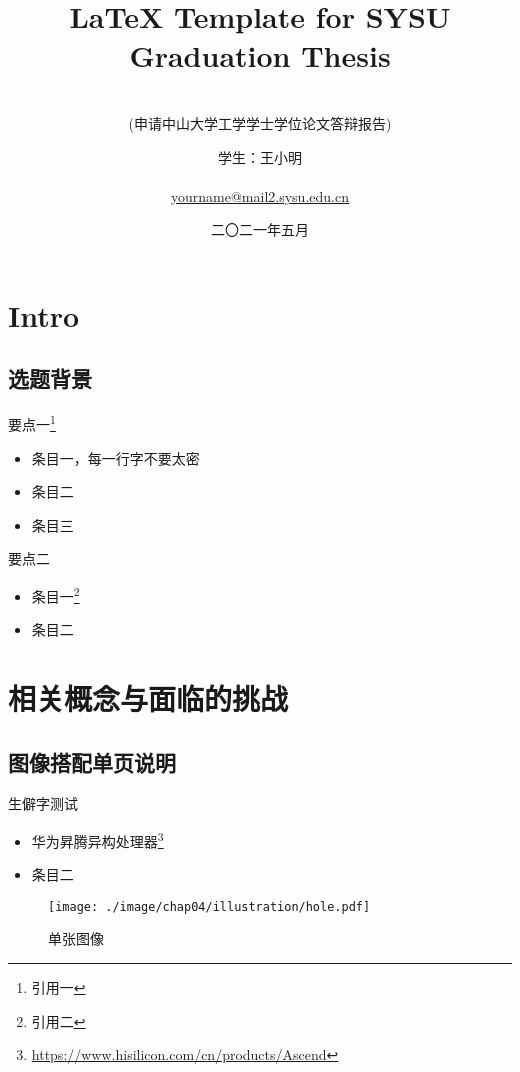 \documentclass[
    fontset=fandol,
    xcolor=x11names %
]{ctexbeamer}
\title{{\LaTeX} Template for SYSU Graduation Thesis}
\subtitle[申请中山大学工学学士学位论文答辩报告]{
    ~\\
    (申请中山大学工学学士学位论文答辩报告)
}
\author[王小明]{
    \texorpdfstring{
        学生：王小明\\
        ~\\
        \href{mailto:yourname@mail2.sysu.edu.cn}{yourname@mail2.sysu.edu.cn}
    }{PDF Bookmark Version}
}
\institute[中山大学~计算机学院（软件学院）]{
    \texttt{[image: ./image/template/logo.png]}
}
\date{
    二〇二一年五月
}
\begin{document}
\section{Intro}

\begin{frame}

    \titlepage

\end{frame}

\subsection{选题背景}

\begin{frame}

    \begin{block}{要点一\footnote{引用一}}
        \begin{itemize}
            \item 条目一，每一行字不要太密
            \item 条目二
            \item 条目三
        \end{itemize}
    \end{block}

    \begin{block}{要点二}
        \begin{itemize}
            \item 条目一\footnote{引用二}
            \item 条目二
        \end{itemize}
    \end{block}

\end{frame}

\section{相关概念与面临的挑战}

\subsection{图像搭配单页说明}

\begin{frame}

    \begin{block}{生僻字测试}
        \begin{itemize}
            \item 华为昇腾异构处理器\footnote{\url{https://www.hisilicon.com/cn/products/Ascend}}
            \item 条目二
        \end{itemize}
    \end{block}

    \begin{figure}
        \texttt{[image: ./image/chap04/illustration/hole.pdf]}
        \caption{单张图像}
        \label{fig:hole}
    \end{figure}

\end{frame}
\end{document}

